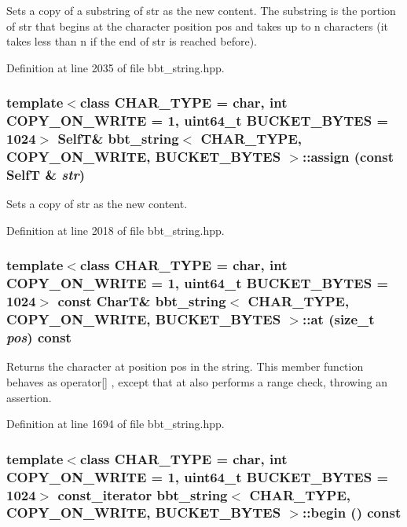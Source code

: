 Sets a copy of a substring of str as the new content. The substring is the portion of str that begins at the character position pos and takes up to n characters (it takes less than n if the end of str is reached before). 

Definition at line 2035 of file bbt\_\-string.hpp.\hypertarget{classbbt__string_a2171144958b01ccef526ec918229697}{
\subsubsection[{assign}]{\setlength{\rightskip}{0pt plus 5cm}template$<$class CHAR\_\-TYPE  = char, int COPY\_\-ON\_\-WRITE = 1, uint64\_\-t BUCKET\_\-BYTES = 1024$>$ {\bf SelfT}\& {\bf bbt\_\-string}$<$ CHAR\_\-TYPE, COPY\_\-ON\_\-WRITE, BUCKET\_\-BYTES $>$::assign (const {\bf SelfT} \& {\em str})}}
\label{classbbt__string_a2171144958b01ccef526ec918229697}


Sets a copy of str as the new content. 

Definition at line 2018 of file bbt\_\-string.hpp.\hypertarget{classbbt__string_96366cce7bcb5045b562135e6bc20444}{
\subsubsection[{at}]{\setlength{\rightskip}{0pt plus 5cm}template$<$class CHAR\_\-TYPE  = char, int COPY\_\-ON\_\-WRITE = 1, uint64\_\-t BUCKET\_\-BYTES = 1024$>$ const CharT\& {\bf bbt\_\-string}$<$ CHAR\_\-TYPE, COPY\_\-ON\_\-WRITE, BUCKET\_\-BYTES $>$::at (size\_\-t {\em pos}) const}}
\label{classbbt__string_96366cce7bcb5045b562135e6bc20444}


Returns the character at position pos in the string. This member function behaves as operator\mbox{[}\mbox{]} , except that at also performs a range check, throwing an assertion. 

Definition at line 1694 of file bbt\_\-string.hpp.\hypertarget{classbbt__string_65dc62558aea86248f43967709e4e012}{
\subsubsection[{begin}]{\setlength{\rightskip}{0pt plus 5cm}template$<$class CHAR\_\-TYPE  = char, int COPY\_\-ON\_\-WRITE = 1, uint64\_\-t BUCKET\_\-BYTES = 1024$>$ const\_\-iterator {\bf bbt\_\-string}$<$ CHAR\_\-TYPE, COPY\_\-ON\_\-WRITE, BUCKET\_\-BYTES $>$::begin () const}}
\label{classbbt__string_65dc62558aea86248f43967709e4e012}


